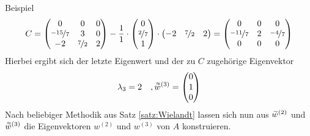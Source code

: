 \begin{colboxBreakable}{Beispiel}
  \begin{align*}
    C = \begin{pmatrix}
    0 & 0 & 0 \\ \nicefrac{-15}{7} & 3 & 0 \\ -2 & \nicefrac{7}{2} & 2
  \end{pmatrix} - \dfrac{1}{1}\cdot \begin{pmatrix}
      0 \\ \nicefrac{2}{7} \\ 1
    \end{pmatrix} \cdot \begin{pmatrix}
      -2 & \nicefrac{7}{2} & 2
    \end{pmatrix} = \left(\begin{matrix}
      0 & 0 & 0 \\
      \nicefrac{-11}{7} & 2 & \nicefrac{-4}{7} \\
      0 & 0 & 0
    \end{matrix}\right)
  \end{align*}
  Hierbei ergibt sich der letzte Eigenwert und der zu $C$ zugehörige Eigenvektor
  \begin{align*}
    \lambda_3=2 \quad, \accentset{\approx}{w}^{(3)}=\begin{pmatrix}
      0 \\ 1 \\ 0
    \end{pmatrix}
  \end{align*}
  Nach beliebiger Methodik aus Satz \ref{satz:Wielandt} lassen sich nun aus 
  $\accentset{\sim}{w}^{(2)}$ und $\accentset{\approx}{w}^{(3)}$ die Eigenvektoren $w^{(2)}$
  und $w^{(3)}$ von $A$ konstruieren.
\end{colboxBreakable}